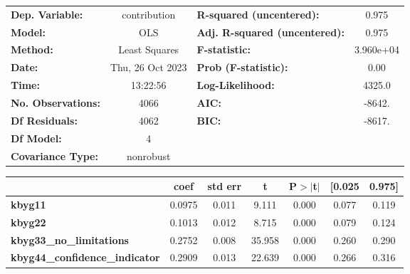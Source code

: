\begin{center}
\begin{tabular}{lclc}
\toprule
\textbf{Dep. Variable:}                &   contribution   & \textbf{  R-squared (uncentered):}      &     0.975   \\
\textbf{Model:}                        &       OLS        & \textbf{  Adj. R-squared (uncentered):} &     0.975   \\
\textbf{Method:}                       &  Least Squares   & \textbf{  F-statistic:       }          & 3.960e+04   \\
\textbf{Date:}                         & Thu, 26 Oct 2023 & \textbf{  Prob (F-statistic):}          &     0.00    \\
\textbf{Time:}                         &     13:22:56     & \textbf{  Log-Likelihood:    }          &    4325.0   \\
\textbf{No. Observations:}             &        4066      & \textbf{  AIC:               }          &    -8642.   \\
\textbf{Df Residuals:}                 &        4062      & \textbf{  BIC:               }          &    -8617.   \\
\textbf{Df Model:}                     &           4      & \textbf{                     }          &             \\
\textbf{Covariance Type:}              &    nonrobust     & \textbf{                     }          &             \\
\bottomrule
\end{tabular}
\begin{tabular}{lcccccc}
                                       & \textbf{coef} & \textbf{std err} & \textbf{t} & \textbf{P$> |$t$|$} & \textbf{[0.025} & \textbf{0.975]}  \\
\midrule
\textbf{kbyg11}                        &       0.0975  &        0.011     &     9.111  &         0.000        &        0.077    &        0.119     \\
\textbf{kbyg22}                        &       0.1013  &        0.012     &     8.715  &         0.000        &        0.079    &        0.124     \\
\textbf{kbyg33\_no\_limitations}       &       0.2752  &        0.008     &    35.958  &         0.000        &        0.260    &        0.290     \\
\textbf{kbyg44\_confidence\_indicator} &       0.2909  &        0.013     &    22.639  &         0.000        &        0.266    &        0.316     \\

\end{tabular}
\end{center}
